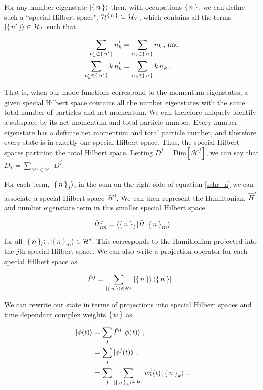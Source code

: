 \documentclass[aps,prd,twocolumn,superscriptaddress]{revtex4-1}
\begin{document}
For any number eigenstate $\ket{\set{n}}$ then, with occupations $\set{n}$, we can define such a ``special Hilbert space", $\mathcal{H}^{\set{n}} \subseteq \mathcal{H}_T$, which contains all the terms $\ket{\set{n'}} \in \mathcal{H}_T$ such that 

\begin{align}
    \sum_{n'_k \in \set{n'}} n'_k &= \sum_{n_k \in \set{n}} n_k \, \textrm{, and} \\
    \sum_{n'_k \in \set{n'}} k \, n'_k &= \sum_{n_k \in \set{n}} k \, n_k \, .
\end{align}

That is, when our mode functions correspond to the momentum eigenstates, a given special Hilbert space contains all the number eigenstates with the same total number of particles and net momentum. We can therefore uniquely identify a subspace by its net momentum and total particle number. Every number eigenstate has a definite net momentum and total particle number, and therefore every state is in exactly one special Hilbert space. Thus, the special Hilbert spaces partition the total Hilbert space. Letting $D^j = \mathrm{Dim}[\mathcal{H}^j]$, we can say that $D_T = \sum_{\textrm{$\mathcal{H}^j \in \mathcal{H}_T$}} D^j$.

For each term, $\ket{\set{n}_j}$, in the sum on the right side of equation \eqref{schr_n} we can associate a special Hilbert space $\mathcal{H}^j$. We can then represent the Hamiltonian, $\hat H^j$ and number eigenstate term in this smaller special Hilbert space.

\begin{equation}
    \hat H_{lm}^j = \braket{\set{n}_l | \hat H | \set{n}_m}
\end{equation}

for all $\ket{\set{n}_l}, \ket{\set{n}_m} \in \mathcal{H}^j $. This corresponds to the Hamitlonian projected into the $j$th special Hilbert space. We can also write a projection operator for each special Hilbert space as

\begin{equation}
    \hat P^j = \sum_{\ket{\set{n}} \in \mathcal{H}^j} \ket{\set{n}} \bra{\set{n}} \, .
\end{equation}

We can rewrite our state in terms of projections into special Hilbert spaces and time dependant complex weights $\set{w}$ as

\begin{align}
    \ket{\phi(t)} &= \sum_j \hat P^j \ket{\phi(t)} \, , \\
    &= \sum_j \ket{\phi^j(t)} \, , \\
    &= \sum_j \sum_{\ket{\set{n}_k} \in \mathcal{H}^j} w^j_k(t) \ket{\set{n}_k} \, .
\end{align}
\end{document}
